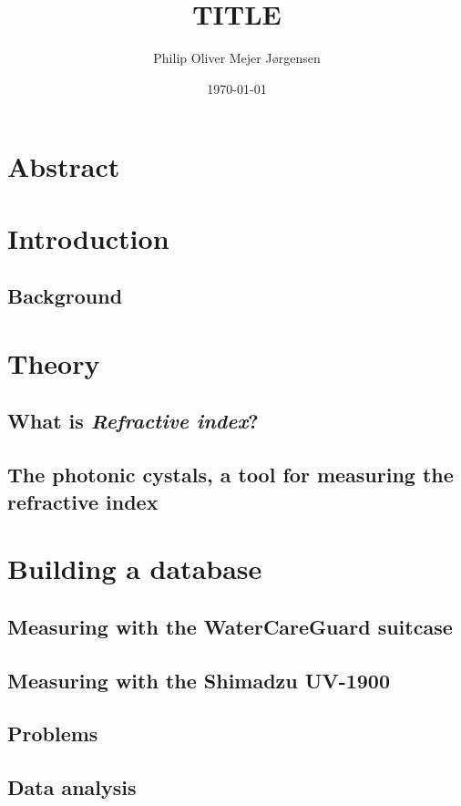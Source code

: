 \documentclass{article}
\title{TITLE}
\author{Philip Oliver Mejer Jørgensen}
\date{\today}
\begin{document}
\maketitle

\newpage

\tableofcontents

\newpage

\section{Abstract}

\section{Introduction}
\subsection{Background}

\section{Theory}
\subsection{What is \textit{Refractive index}?}
\subsection{The photonic cystals, a tool for measuring the refractive index}

\section{Building a database}
\subsection{Measuring with the WaterCareGuard suitcase}
\subsection{Measuring with the Shimadzu UV-1900}
\subsection{Problems}
\subsection{Data analysis}
\end{document}
